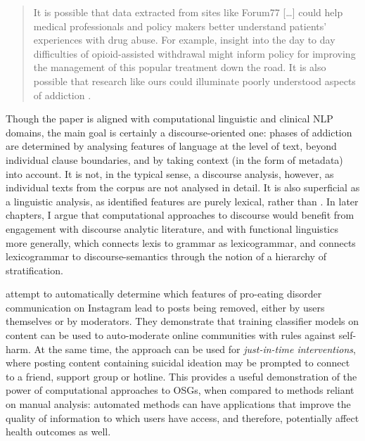 \begin{quote}\singlespacing\small
It is possible that data extracted from sites like Forum77 [\dots] could help medical professionals and policy makers better understand patients' experiences with drug abuse. For example, insight into the day to day difficulties of opioid\hyp{}assisted withdrawal might inform policy for improving the management of this popular treatment down the road. It is also possible that research like ours could illuminate poorly understood aspects of addiction \parencite*[p.~12]{maclean_forum77:_2015}.
\end{quote}
%
Though the paper is aligned with computational linguistic and clinical \gls{NLP} domains, the main goal is certainly a discourse\hyp{}oriented one: phases of addiction are determined by analysing features of language at the level of text, beyond individual clause boundaries, and by taking context (in the form of metadata) into account. It is not, in the typical sense, a discourse analysis, however, as individual texts from the \gls{corpus} are not analysed in detail. It is also superficial as a linguistic analysis, as identified features are purely lexical, rather than . In later chapters, I argue that computational approaches to discourse would benefit from engagement with discourse analytic literature, and with functional linguistics more generally, which connects lexis to grammar as lexicogrammar, and connects lexicogrammar to \glspl{discourse-semantic} through the notion of a hierarchy of stratification.

\textcite{chancellor_this_2016} attempt to automatically determine which features of pro\hyp{}eating disorder communication on Instagram lead to \glspl{post} being removed, either by users themselves or by moderators. They demonstrate that training classifier models on content can be used to auto\hyp{}moderate online communities with rules against self\hyp{}harm. At the same time, the approach can be used for \emph{just\hyp{}in\hyp{}time interventions}, where  posting content containing suicidal ideation may be prompted to connect to a friend, support group or hotline. This provides a useful demonstration of the power of computational approaches to \glspl{OSG}, when compared to methods reliant on manual analysis: automated methods can have applications that improve the quality of information to which users have access, and therefore, potentially affect health outcomes as well.

